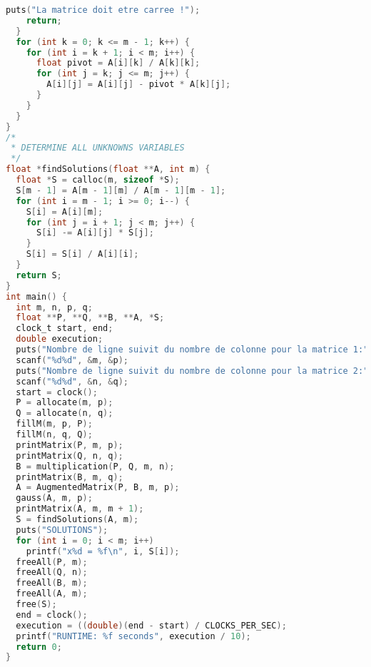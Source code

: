 \begin{lstlisting}[language=C,inputencoding=utf8, basicstyle=\fontsize{8}{10}\selectfont]
    puts("La matrice doit etre carree !");
    return;
  }
  for (int k = 0; k <= m - 1; k++) {
    for (int i = k + 1; i < m; i++) {
      float pivot = A[i][k] / A[k][k];
      for (int j = k; j <= m; j++) {
        A[i][j] = A[i][j] - pivot * A[k][j];
      }
    }
  }
}
/*
 * DETERMINE ALL UNKNOWNS VARIABLES
 */
float *findSolutions(float **A, int m) {
  float *S = calloc(m, sizeof *S);
  S[m - 1] = A[m - 1][m] / A[m - 1][m - 1];
  for (int i = m - 1; i >= 0; i--) {
    S[i] = A[i][m];
    for (int j = i + 1; j < m; j++) {
      S[i] -= A[i][j] * S[j];
    }
    S[i] = S[i] / A[i][i];
  }
  return S;
}
int main() {
  int m, n, p, q;
  float **P, **Q, **B, **A, *S;
  clock_t start, end;
  double execution;
  puts("Nombre de ligne suivit du nombre de colonne pour la matrice 1:");
  scanf("%d%d", &m, &p);
  puts("Nombre de ligne suivit du nombre de colonne pour la matrice 2:");
  scanf("%d%d", &n, &q);
  start = clock();
  P = allocate(m, p);
  Q = allocate(n, q);
  fillM(m, p, P);
  fillM(n, q, Q);
  printMatrix(P, m, p);
  printMatrix(Q, n, q);
  B = multiplication(P, Q, m, n);
  printMatrix(B, m, q);
  A = AugmentedMatrix(P, B, m, p);
  gauss(A, m, p);
  printMatrix(A, m, m + 1);
  S = findSolutions(A, m);
  puts("SOLUTIONS");
  for (int i = 0; i < m; i++)
    printf("x%d = %f\n", i, S[i]);
  freeAll(P, m);
  freeAll(Q, n);
  freeAll(B, m);
  freeAll(A, m);
  free(S);
  end = clock();
  execution = ((double)(end - start) / CLOCKS_PER_SEC);
  printf("RUNTIME: %f seconds", execution / 10);
  return 0;
}

\end{lstlisting}

